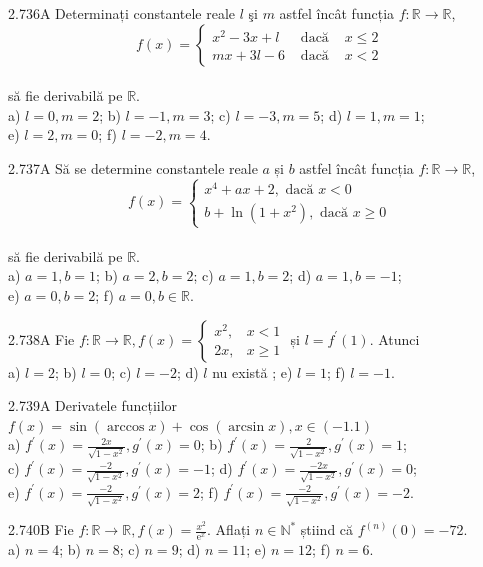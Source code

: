 \documentclass[11pt]{article}
\begin{document}
2.736A Determinați constantele reale $l$ şi $m$ astfel încât funcția $f: \mathbb{R} \rightarrow \mathbb{R}$, $$f(x)=\left\{\begin{array}{lll}x^{2}-3 x+l & \text { dacă } & x \leq 2 \\m x+3 l-6 & \text { dacă } & x<2\end{array}\right.$$\\să fie derivabilă pe $\mathbb{R}$.\\ a) $l=0, m=2$; b) $l=-1, m=3$; c) $l=-3, m=5$; d) $l=1, m=1$;\\ e) $l=2, m=0$; f) $l=-2, m=4$.

2.737A Să se determine constantele reale $a$ și $b$ astfel încât funcția $f: \mathbb{R} \rightarrow \mathbb{R}$,$$f(x)=\left\{\begin{array}{l}x^{4}+a x+2, \text { dacă } x<0 \\b+\ln \left(1+x^{2}\right), \text { dacă } x \geq 0\end{array}\right.$$\\să fie derivabilă pe $\mathbb{R}$.\\ a) $a=1, b=1$; b) $a=2, b=2$; c) $a=1, b=2$; d) $a=1, b=-1$;\\ e) $a=0, b=2$; f) $a=0, b \in \mathbb{R}$.

2.738A Fie $f: \mathbb{R} \rightarrow \mathbb{R}, f(x)=\left\{\begin{array}{ll}x^{2}, & x<1 \\ 2 x, & x \geq 1\end{array}\right.$ și $l=f^{\prime}(1)$. Atunci\\ a) $l=2$; b) $l=0$; c) $l=-2$; d) $l$ nu există ; e) $l=1$; f) $l=-1$.

2.739A Derivatele funcțiilor $f(x)=\sin (\arccos x)+\cos (\arcsin x), x \in(-1.1)$\\ a) $f^{\prime}(x)=\frac{2 x}{\sqrt{1-x^{2}}}, g^{\prime}(x)=0$; b) $f^{\prime}(x)=\frac{2}{\sqrt{1-x^{2}}}, g^{\prime}(x)=1$;\\ c) $f^{\prime}(x)=\frac{-2}{\sqrt{1-x^{2}}}, g^{\prime}(x)=-1$; d) $f^{\prime}(x)=\frac{-2 x}{\sqrt{1-x^{2}}}, g^{\prime}(x)=0$;\\ e) $f^{\prime}(x)=\frac{-2}{\sqrt{1-x^{2}}}, g^{\prime}(x)=2$; f) $f^{\prime}(x)=\frac{-2}{\sqrt{1-x^{2}}}, g^{\prime}(x)=-2$.

2.740B Fie $f: \mathbb{R} \rightarrow \mathbb{R}, f(x)=\frac{x^{2}}{\mathrm{e}^{x}}$. Aflați $n \in \mathbb{N}^{*}$ știind că $f^{(n)}(0)=-72$.\\ a) $n=4$; b) $n=8$; c) $n=9$; d) $n=11$; e) $n=12$; f) $n=6$.
\end{document}
